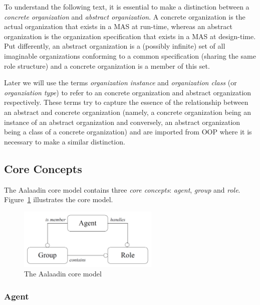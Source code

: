 To understand the following text, it is essential to make a distinction between a \textit{concrete organization} and \textit{abstract organization}.
A concrete organization is the actual organization that exists in a MAS at run-time, whereas an abstract organization is the organization specification that exists in a MAS at design-time.
Put differently, an abstract organization is a (possibly infinite) set of all imaginable organizations conforming to a common specification (sharing the same role structure) and a concrete organization is a member of this set.

Later we will use the terms \textit{organization instance} and \textit{organization class} (or \textit{organziation type}) to refer to an concrete organization and abstract organization respectively.
These terms try to capture the essence of the relationship between an abstract and concrete organization (namely, a concrete organization being an instance of an abstract organization and conversely, an abstract organization being a class of a concrete organization) and are imported from OOP where it is necessary to make a similar distinction. 

\subsection{Core Concepts}

The Aalaadin core model contains three \textit{core concepts}: \textit{agent}, \textit{group} and \textit{role}.
Figure~\ref{figure:aalaadin-core-model} illustrates the core model.

\begin{figure}[h]
	\centering
	\includegraphics[width=0.6\textwidth]{images/aalaadin/core-model.png}
	\caption{The Aalaadin core model \cite{Ferber97}}
	\label{figure:aalaadin-core-model}
\end{figure}

\subsubsection*{Agent}

